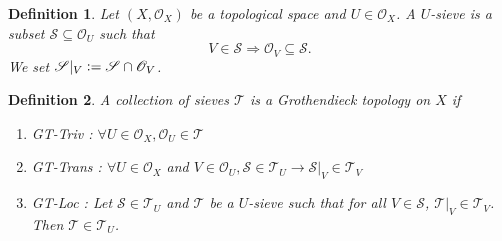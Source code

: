 \documentclass[8pt]{article}
\numberwithin{equation}{section}
\newtheorem{definition}{Definition}[section]
\newcommand{\defeq}{\vcentcolon=}
\newcommand{\Ouv}{\mathscr{O}}
\newcommand{\sS}[0]{\mathscr{S}}
\begin{document}
\begin{definition}
  Let $(X,\Ouv_X)$ be a topological space and $U\in\Ouv_X$. A $U$-sieve is a subset $\sS\subseteq\Ouv_U$ such that 
  \begin{equation*}
    V\in\sS\Rightarrow \Ouv_V\subseteq\sS.
  \end{equation*}
  We set $\sS|_V \defeq \sS\cap\Ouv_V$.
\end{definition}
\begin{definition}
  A collection of sieves $\mathcal{T}$ is a Grothendieck topology on $X$ if 
\begin{enumerate}[]
  \item GT-Triv : $\forall U\in\Ouv_X,\Ouv_U\in\mathcal{T}$
  \item GT-Trans : $\forall U\in\Ouv_X$ and $V\in\Ouv_U, \sS\in\mathcal{T}_U\rightarrow \sS|_V\in\mathcal{T}_V$
  \item GT-Loc : Let $\sS\in\mathcal{T}_U$ and $\mathscr{T}$ be a $U$-sieve such that for all $V\in\sS$, $\mathscr{T}|_V\in\mathcal{T}_V$. Then $\mathscr{T}\in\mathcal{T}_U$.
\end{enumerate}
\end{definition}
\end{document}
